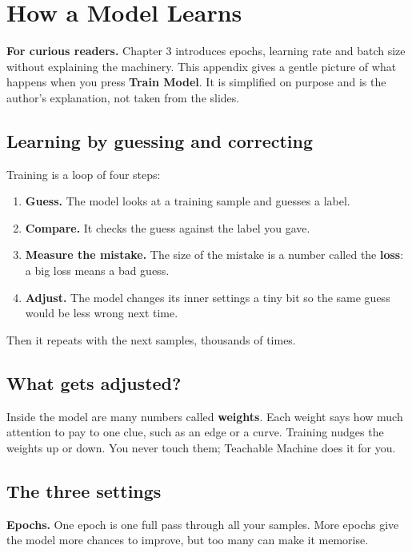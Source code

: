 \chapter{How a Model Learns}

\begin{notebox}
\textbf{For curious readers.} Chapter 3 introduces epochs, learning rate and batch size without explaining the machinery. This appendix gives a gentle picture of what happens when you press \textbf{Train Model}. It is simplified on purpose and is the author’s explanation, not taken from the slides.
\end{notebox}

\section{Learning by guessing and correcting}

Training is a loop of four steps:


\begin{enumerate}
\item \textbf{Guess.} The model looks at a training sample and guesses a label.
\item \textbf{Compare.} It checks the guess against the label you gave.
\item \textbf{Measure the mistake.} The size of the mistake is a number called the \textbf{loss}: a big loss means a bad guess.
\item \textbf{Adjust.} The model changes its inner settings a tiny bit so the same guess would be less wrong next time.
\end{enumerate}

Then it repeats with the next samples, thousands of times.


\section{What gets adjusted?}

Inside the model are many numbers called \textbf{weights}. Each weight says how much attention to pay to one clue, such as an edge or a curve. Training nudges the weights up or down. You never touch them; Teachable Machine does it for you.


\section{The three settings}

\textbf{Epochs.} One epoch is one full pass through all your samples. More epochs give the model more chances to improve, but too many can make it memorise.


